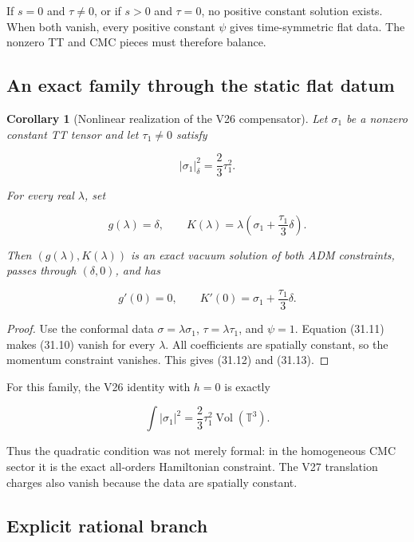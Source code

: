\documentclass[11pt]{article}
\newtheorem{corollary}[theorem]{Corollary}
\theoremstyle{remark}
\begin{document}
If \(s=0\) and \(\tau\neq0\), or if \(s>0\) and \(\tau=0\), no positive
constant solution exists.  When both vanish, every positive constant
\(\psi\) gives time-symmetric flat data.  The nonzero TT and CMC pieces
must therefore balance.

\subsection{An exact family through the static flat datum}

\begin{corollary}[Nonlinear realization of the V26 compensator]
\label{cor:v19v28-family}
Let \(\sigma_1\) be a nonzero constant TT tensor and let
\(\tau_1\neq0\) satisfy

\[
 |\sigma_1|_\delta^2=\frac23\tau_1^2.                         \tag{31.11}
\]

For every real \(\lambda\), set

\[
 g(\lambda)=\delta,\qquad
 K(\lambda)=\lambda\left(\sigma_1+\frac{\tau_1}{3}\delta\right).
                                                                    \tag{31.12}
\]

Then \((g(\lambda),K(\lambda))\) is an exact vacuum solution of both ADM
constraints, passes through \((\delta,0)\), and has

\[
 g'(0)=0,\qquad K'(0)=\sigma_1+\frac{\tau_1}{3}\delta.         \tag{31.13}
\]
\end{corollary}

\begin{proof}
Use the conformal data
\(\sigma=\lambda\sigma_1\), \(\tau=\lambda\tau_1\), and \(\psi=1\).
Equation (31.11) makes (31.10) vanish for every \(\lambda\).  All
coefficients are spatially constant, so the momentum constraint
vanishes.  This gives (31.12) and (31.13).
\end{proof}

For this family, the V26 identity with \(h=0\) is exactly

\[
 \int|\sigma_1|^2
 =\frac23\tau_1^2\operatorname{Vol}(\mathbb T^3).             \tag{31.14}
\]

Thus the quadratic condition was not merely formal: in the homogeneous
CMC sector it is the exact all-orders Hamiltonian constraint.  The V27
translation charges also vanish because the data are spatially constant.

\subsection{Explicit rational branch}
\end{document}
